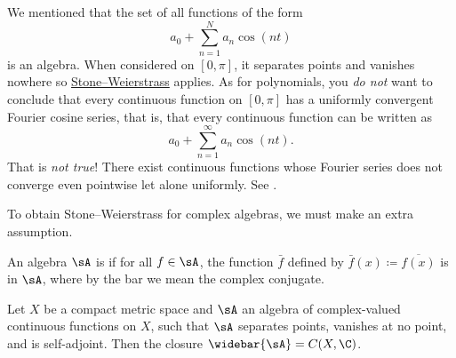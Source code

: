 \begin{example}
We mentioned that the set of all functions of the form
\begin{equation*}
a_0 +
\sum_{n=1}^N a_n \cos(nt)
\end{equation*}
is an algebra.
When considered on $[0,\pi]$, 
it separates points and vanishes nowhere so
\hyperref[thm:SWreal]{Stone--Weierstrass} applies.
As for polynomials, you \emph{do not} want to conclude that every continuous
function on $[0,\pi]$ has a uniformly convergent
Fourier cosine series, that is, that every continuous
function can be written as
\begin{equation*}
a_0 +
\sum_{n=1}^\infty a_n \cos(nt) .
\end{equation*}
That is \emph{not true}!
There exist continuous functions
whose Fourier series does not converge even pointwise
let alone uniformly.  See .
\end{example}

To obtain Stone--Weierstrass for complex algebras, we must
make an extra assumption.

\begin{defn}
An algebra $\sA$ is \emph{} if for all $f \in \sA$, the function
$\bar{f}$ defined by $\bar{f}(x) \coloneqq \overline{f(x)}$ is in $\sA$, where by the
bar we mean the complex conjugate.
\end{defn}

\begin{thm}
\label{thm:SWcomplex}%
%
Let $X$ be a compact metric space and $\sA$ an algebra of complex-valued
continuous functions on $X$, such that $\sA$ separates points, vanishes at
no point, and is self-adjoint.  Then the closure $\widebar{\sA} = C(X,\C)$.
\end{thm}

